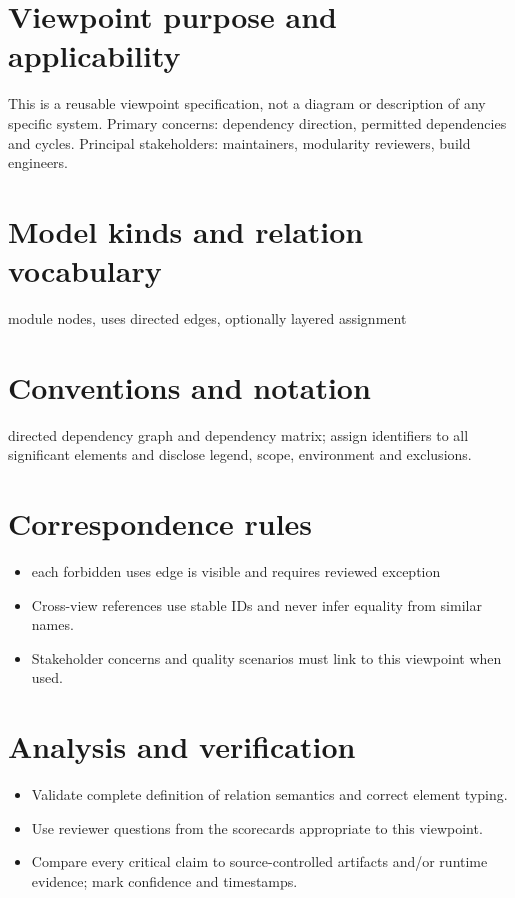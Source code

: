 \documentclass[10pt,letterpaper]{article}
\begin{document}
\DocProvenance
\section{Viewpoint purpose and applicability}
This is a reusable viewpoint specification, not a diagram or description of any specific system. Primary concerns: dependency direction, permitted dependencies and cycles. Principal stakeholders: maintainers, modularity reviewers, build engineers.

\section{Model kinds and relation vocabulary}
module nodes, uses directed edges, optionally layered assignment

\section{Conventions and notation}
directed dependency graph and dependency matrix; assign identifiers to all significant elements and disclose legend, scope, environment and exclusions.

\section{Correspondence rules}
\begin{itemize}
\item each forbidden uses edge is visible and requires reviewed exception
\item Cross-view references use stable IDs and never infer equality from similar names.
\item Stakeholder concerns and quality scenarios must link to this viewpoint when used.
\end{itemize}
\section{Analysis and verification}
\begin{itemize}
\item Validate complete definition of relation semantics and correct element typing.
\item Use reviewer questions from the scorecards appropriate to this viewpoint.
\item Compare every critical claim to source-controlled artifacts and/or runtime evidence; mark confidence and timestamps.
\end{itemize}
\end{document}
